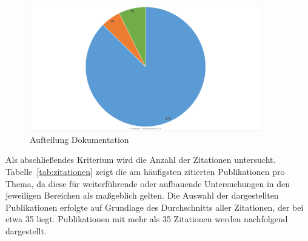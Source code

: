 \begin{figure}[!htbp]
    \centering
    \caption{Aufteilung Dokumentation}
    \label{fig:16-dokumentation}
    \includegraphics[width=0.90\textwidth]{graphics/16-dokumentation3.png}
\end{figure}

Als abschließendes Kriterium wird die Anzahl der Zitationen untersucht. Tabelle~\ref{tab:zitationen} zeigt die am häufigsten zitierten Publikationen pro Thema, da diese für weiterführende oder aufbauende Untersuchungen in den jeweiligen Bereichen als maßgeblich gelten. Die Auswahl der dargestellten Publikationen erfolgte auf Grundlage des Durchschnitts aller Zitationen, der bei etwa 35 liegt. Publikationen mit mehr als 35 Zitationen werden nachfolgend dargestellt.


